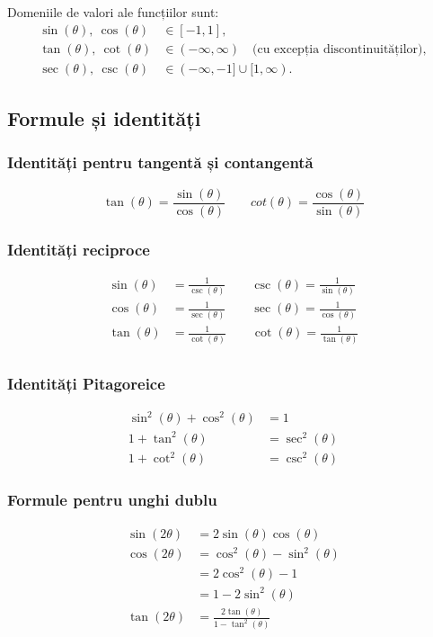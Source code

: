 \documentclass[11pt,a4paper]{article}
\begin{document}
\noindent Domeniile de valori ale funcțiilor sunt:
\begin{align*}
\sin(\theta),\ \cos(\theta) &\in [-1, 1],\\
\tan(\theta),\ \cot(\theta) &\in (-\infty, \infty) \quad \text{(cu excepția discontinuităților)},\\
\sec(\theta),\ \csc(\theta) &\in (-\infty, -1] \cup [1, \infty).
\end{align*}

\subsection{Formule și identități}
\subsubsection{Identități pentru tangentă și contangentă} 
$$\tan(\theta)=\frac{\sin(\theta)}{\cos(\theta)} \quad\quad cot(\theta)=\frac{\cos(\theta)}{\sin(\theta)}$$
\subsubsection{Identități reciproce}
\begin{align*}
\sin(\theta) &= \frac{1}{\csc(\theta)} \quad\quad \csc(\theta) = \frac{1}{\sin(\theta)} \\
\cos(\theta) &= \frac{1}{\sec(\theta)} \quad\quad \sec(\theta) = \frac{1}{\cos(\theta)} \\
\tan(\theta) &= \frac{1}{\cot(\theta)} \quad\quad \cot(\theta) = \frac{1}{\tan(\theta)} \\
\end{align*}
\subsubsection{Identități Pitagoreice}
\begin{align*}
\sin^2(\theta) + \cos^2(\theta) &= 1 \\
1 + \tan^2(\theta) &= \sec^2(\theta) \\
1 + \cot^2(\theta) &= \csc^2(\theta)
\end{align*}
\subsubsection{Formule pentru unghi dublu}
\begin{align*}
\sin(2\theta) &= 2\sin(\theta)\cos(\theta) \\
\cos(2\theta) &= \cos^2(\theta) - \sin^2(\theta) \\
              &= 2\cos^2(\theta) - 1 \\
              &= 1 - 2\sin^2(\theta) \\
\tan(2\theta) &= \frac{2\tan(\theta)}{1 - \tan^2(\theta)}
\end{align*}
\end{document}
